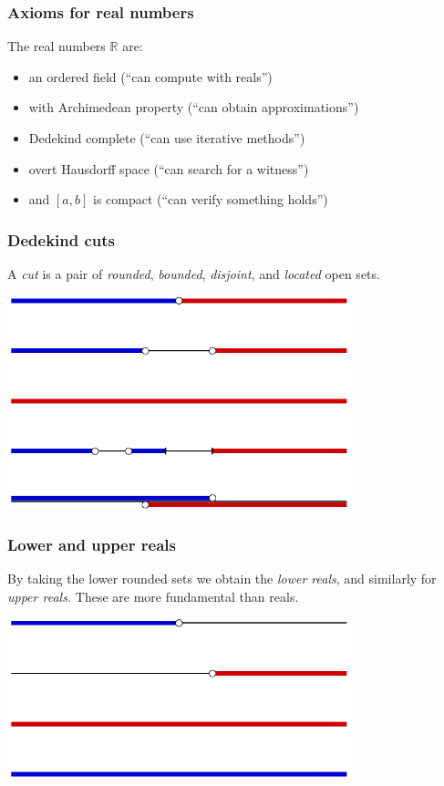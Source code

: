 \documentclass{beamer}
\newcommand{\RR}{\mathbb{R}}
\begin{document}
\begin{frame}
  \frametitle{Axioms for real numbers}

  The real numbers $\RR$ are:
  \begin{itemize}
  \item an ordered field (``can compute with reals'')
  \item with Archimedean property (``can obtain approximations'')
  \item Dedekind complete (``can use iterative methods'')
  \item overt Hausdorff space (``can search for a witness'')
  \item and $[a,b]$ is compact (``can verify something holds'')
  \end{itemize}
\end{frame}

\begin{frame}
  \frametitle{Dedekind cuts}

  A \emph{cut} is a pair of \emph{rounded}, \emph{bounded},
  \emph{disjoint}, and \emph{located} open sets.

  \bigskip

  \begin{center}
    \includegraphics[width=0.75\textwidth]{cuts}
  \end{center}

\end{frame}

\begin{frame}
  \frametitle{Lower and upper reals}

  By taking the lower rounded sets we obtain the \emph{lower reals},
  and similarly for \emph{upper reals.} These are more fundamental
  than reals.

  \bigskip\bigskip

  \begin{center}
    \includegraphics[width=0.75\textwidth]{lower_upper}
  \end{center}

\end{frame}
\end{document}
